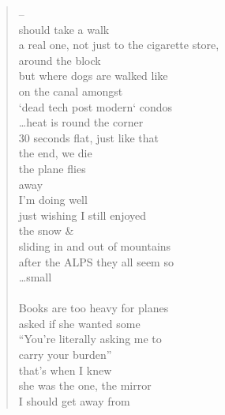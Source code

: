 \documentclass[11pt]{article}
\begin{document}
\begin{verse}
\hspace*{7em}--\\
\hspace*{4em}should take a walk\\
a real one, not just to the cigarette store,\\
around the block\\
but where dogs are walked like\\
on the canal amongst\\
`dead tech post modern` condos\\
\ldots heat is round the corner\\
\hspace*{1em}30 seconds flat, just like that\\
\hspace*{1em}the end, we die\\
\hspace*{4em}the plane flies\\
\hspace*{8em}away\\
\vspace*{1em}
\hspace*{4em}I'm doing well\\
\hspace*{5em}just wishing I still enjoyed\\
\hspace*{6em}the snow \&\\
\hspace*{7em}sliding in and out of mountains\\
\vspace*{1em}
\hspace*{7em}after the ALPS  they all seem so\\
\hspace*{8em}\ldots small\\
\vspace*{1em}
\clearpage\\
Books are too heavy for planes\\
\hspace*{1em}asked if she wanted some\\
\hspace*{2em}``You're literally asking me to\\
\hspace*{4em}carry your burden''\\
that's when I knew\\
she was the one, the mirror\\
\hspace*{4em}I should get away from\\

\end{verse}
\end{document}
